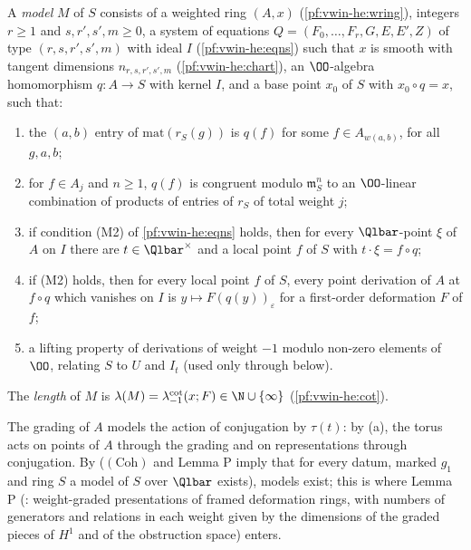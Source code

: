 \begin{definition}[Models]\label{pf:eis:model}
A \emph{model} $M$ of $S$ consists of a weighted ring $(A,x)$ (\cref{pf:vwin-he:wring}), integers $r\ge1$ and
$s,r',s',m\ge0$, a system of equations $Q=(F_0,\dots,F_r,G,E,E',Z)$ of type $(r,s,r',s',m)$ with ideal $I$
(\cref{pf:vwin-he:eqns}) such that $x$ is smooth with tangent dimensions $n_{r,s,r',s',m}$ (\cref{pf:vwin-he:chart}), an
$\OO$-algebra homomorphism $q:A\to S$ with kernel $I$, and a base point $x_0$ of $S$ with $x_0\circ q=x$, such that:
\begin{enumerate}[label=(\alph*)]
\item the $(a,b)$ entry of $\mathrm{mat}(r_S(g))$ is $q(f)$ for some $f\in A_{w(a,b)}$, for all $g,a,b$;
\item for $f\in A_j$ and $n\ge1$, $q(f)$ is congruent modulo $\mathfrak m_S^n$ to an $\OO$-linear combination of products of
  entries of $r_S$ of total weight $j$;
\item if condition (M2) of \cref{pf:vwin-he:eqns} holds, then for every $\Qlbar$-point $\xi$ of $A$ on $I$ there are
  $t\in\Qlbar^\times$ and a local point $f$ of $S$ with $t\cdot\xi=f\circ q$;
\item if (M2) holds, then for every local point $f$ of $S$, every point derivation of $A$ at $f\circ q$ which vanishes on $I$
  is $y\mapsto F(q(y))_\varepsilon$ for a first-order deformation $F$ of $f$;
\item a lifting property of derivations of weight $-1$ modulo non-zero elements of $\OO$, relating $S$ to $U$ and $I_t$ (used
  only through  below).
\end{enumerate}
The \emph{length} of $M$ is $\lambda(M)=\eiscot_{-1}(x;F)\in\N\cup\{\infty\}$ (\cref{pf:vwin-he:cot}).
\end{definition}

The grading of $A$ models the action of conjugation by $\tau(t)$: by (a), the torus acts on points of $A$ through the
grading and on representations through conjugation. By  ($(\mathrm{Coh})$ and Lemma P
imply that for every datum, marked $g_1$ and ring $S$ a model of $S$ over $\Qlbar$ exists), models exist; this is where
Lemma P (: weight-graded presentations of framed deformation rings, with numbers of
generators and relations in each weight given by the dimensions of the graded pieces of $H^1$ and of the obstruction
space) enters.

